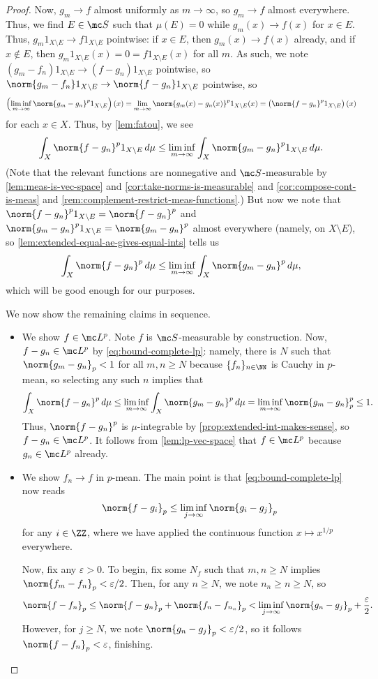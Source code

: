 \documentclass[../notes.tex]{subfiles}
\begin{document}
\begin{proof}
	Now, $g_m\to f$ almost uniformly as $m\to\infty$, so $g_m\to f$ almost everywhere. Thus, we find $E\in\mc S$ such that $\mu(E)=0$ while $g_m(x)\to f(x)$ for $x\in E$. Thus, $g_m1_{X\setminus E}\to f1_{X\setminus E}$ pointwise: if $x\in E$, then $g_m(x)\to f(x)$ already, and if $x\notin E$, then $g_m1_{X\setminus E}(x)=0=f1_{X\setminus E}(x)$ for all $m$. As such, we note $(g_m-f_n)1_{X\setminus E}\to(f-g_n)1_{X\setminus E}$ pointwise, so $\norm{g_m-f_n}1_{X\setminus E}\to\norm{f-g_n}1_{X\setminus E}$ pointwise, so
	\[\left(\liminf_{m\to\infty}\norm{g_m-g_n}^p1_{X\setminus E}\right)(x)=\lim_{m\to\infty}\norm{g_m(x)-g_n(x)}^p1_{X\setminus E}(x)=\left(\norm{f-g_n}^p1_{X\setminus E}\right)(x)\]
	for each $x\in X$. Thus, by \autoref{lem:fatou}, we see
	\[\int_X\norm{f-g_n}^p1_{X\setminus E}\,d\mu\le\liminf_{m\to\infty}\int_X\norm{g_m-g_n}^p1_{X\setminus E}\,d\mu.\]
	(Note that the relevant functions are nonnegative and $\mc S$-measurable by \autoref{lem:meas-is-vec-space} and \autoref{cor:take-norms-is-measurable} and \autoref{cor:compose-cont-is-meas} and \autoref{rem:complement-restrict-meas-functions}.) But now we note that $\norm{f-g_n}^p1_{X\setminus E}=\norm{f-g_n}^p$ and $\norm{g_m-g_n}^p1_{X\setminus E}=\norm{g_m-g_n}^p$ almost everywhere (namely, on $X\setminus E$), so \autoref{lem:extended-equal-ae-gives-equal-ints} tells us
	\begin{equation}
		\int_X\norm{f-g_n}^p\,d\mu\le\liminf_{m\to\infty}\int_X\norm{g_m-g_n}^p\,d\mu, \label{eq:bound-complete-lp}
	\end{equation}
	which will be good enough for our purposes.

	We now show the remaining claims in sequence.
	\begin{itemize}
		\item We show $f\in\mc L^p$. Note $f$ is $\mc S$-measurable by construction. Now, $f-g_n\in\mc L^p$ by \autoref{eq:bound-complete-lp}: namely, there is $N$ such that $\norm{g_m-g_n}_p<1$ for all $m,n\ge N$ because $\{f_n\}_{n\in\NN}$ is Cauchy in $p$-mean, so selecting any such $n$ implies that
		\[\int_X\norm{f-g_n}^p\,d\mu\le\liminf_{m\to\infty}\int_X\norm{g_m-g_n}^p\,d\mu=\liminf_{m\to\infty}\norm{g_m-g_n}_p^p\le1.\]
		Thus, $\norm{f-g_n}^p$ is $\mu$-integrable by \autoref{prop:extended-int-makes-sense}, so $f-g_n\in\mc L^p$. It follows from \autoref{lem:lp-vec-space} that $f\in\mc L^p$ because $g_n\in\mc L^p$ already.
		\item We show $f_n\to f$ in $p$-mean. The main point is that \autoref{eq:bound-complete-lp} now reads
		\[\norm{f-g_i}_p\le\liminf_{j\to\infty}\norm{g_i-g_j}_p\]
		for any $i\in\ZZ$, where we have applied the continuous function $x\mapsto x^{1/p}$ everywhere.

		Now, fix any $\varepsilon>0$. To begin, fix some $N_f$ such that $m,n\ge N$ implies $\norm{f_m-f_n}_p<\varepsilon/2$. Then, for any $n\ge N$, we note $n_n\ge n\ge N$, so
		\[\norm{f-f_n}_p\le\norm{f-g_n}_p+\norm{f_n-f_{n_n}}_p<\liminf_{j\to\infty}\norm{g_n-g_j}_p+\frac\varepsilon2.\]
		However, for $j\ge N$, we note $\norm{g_n-g_j}_p<\varepsilon/2$, so it follows $\norm{f-f_n}_p<\varepsilon$, finishing.
		\qedhere
	\end{itemize}
\end{proof}
\end{document}
